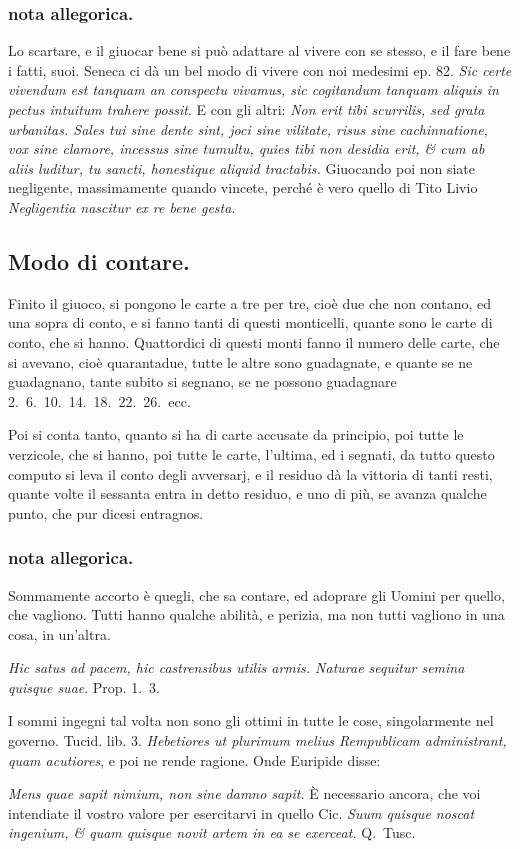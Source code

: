 \documentclass[11pt,a6paper]{article}
\begin{document}
\subsubsection{nota allegorica.}
{\footnotesize
Lo scartare, e il giuocar bene si può adattare al
vivere con se stesso, e il fare bene i fatti, suoi.
Seneca ci dà un bel modo di vivere con noi medesimi
ep. 82. \textit{Sic certe vivendum est tanquam
an conspectu vivamus, sic cogitandum tanquam aliquis
in pectus intuitum trahere possit}. E con gli altri:
\textit{Non erit tibi scurrilis, sed grata urbanitas.
Sales tui sine dente sint, joci sine vilitate, risus sine
cachinnatione, vox sine clamore, incessus sine tumultu,
quies tibi non desidia erit, \& cum ab aliis
luditur, tu sancti, honestique aliquid tractabis.}
Giuocando poi non siate negligente, massimamente
quando vincete, perché è vero quello di Tito Livio
\textit{Negligentia nascitur ex re bene gesta}.
}
\subsection{Modo di contare.}

Finito il giuoco, si pongono le carte a tre
per tre, cioè due che non contano, ed
una sopra di conto, e si fanno tanti di questi
monticelli, quante sono le carte di conto,
che si hanno. Quattordici di questi monti
fanno il numero delle carte, che si avevano,
cioè quarantadue, tutte le altre sono guadagnate,
e quante se ne guadagnano, tante subito
si segnano, se ne possono guadagnare
2.\ 6.\ 10.\ 14.\ 18.\ 22.\ 26.\ ecc.

Poi si conta tanto, quanto si ha di carte
accusate da principio, poi tutte le verzicole,
che si hanno, poi tutte le carte, l'ultima, ed
i segnati, da tutto questo computo si leva il
conto degli avversarj, e il residuo dà la vittoria
di tanti resti, quante volte il sessanta
entra in detto residuo, e uno di più, se avanza
qualche punto, che pur dicesi entragnos.

\subsubsection{nota allegorica.}
{\footnotesize
Sommamente accorto è quegli, che sa contare,
ed adoprare gli Uomini per quello, che vagliono.
Tutti hanno qualche abilità, e perizia, ma non tutti
vagliono in una cosa, in un'altra.

\textit{Hic satus ad pacem, hic castrensibus utilis armis.
Naturae sequitur semina quisque suae}. Prop. 1.\ 3.

I sommi ingegni tal volta non sono gli ottimi
in tutte le cose, singolarmente nel governo. Tucid.
lib. 3. \textit{Hebetiores ut plurimum melius Rempublicam
administrant, quam acutiores}, e poi ne rende
ragione. Onde Euripide disse:

\textit{
Mens quae sapit nimium, non sine damno sapit.}
È necessario ancora, che voi intendiate il vostro valore
per esercitarvi in quello Cic. \textit{Suum quisque noscat
ingenium, \& quam quisque novit artem in ea
se exerceat.} Q.\ Tusc.
}
\end{document}
